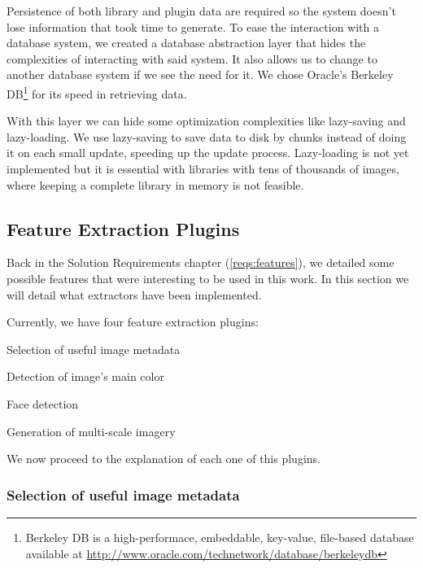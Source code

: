 Persistence of both library and plugin data are required so the system doesn't lose information that took time to generate. To ease the interaction with a database system, we created a database abstraction layer that hides the complexities of interacting with said system. It also allows us to change to another database system if we see the need for it. We chose Oracle's Berkeley DB\footnote{Berkeley DB is a high-performace, embeddable, key-value, file-based database available at \url{http://www.oracle.com/technetwork/database/berkeleydb}} for its speed in retrieving data.

With this layer we can hide some optimization complexities like lazy-saving and lazy-loading. We use lazy-saving to save data to disk by chunks instead of doing it on each small update, speeding up the update process. Lazy-loading is not yet implemented but it is essential with libraries with tens of thousands of images, where keeping a complete library in memory is not feasible.














\subsection{Feature Extraction Plugins} %
\label{sub:plugins}

Back in the Solution Requirements chapter (\ref{reqs:features}), we detailed some possible features that were interesting to be used in this work. In this section we will detail what extractors have been implemented.

Currently, we have four feature extraction plugins:
\begin{myitemize}
	\item Selection of useful image metadata
	\item Detection of image’s main color
	\item Face detection
	\item Generation of multi-scale imagery
\end{myitemize}

We now proceed to the explanation of each one of this plugins. 

\subsubsection{Selection of useful image metadata}

